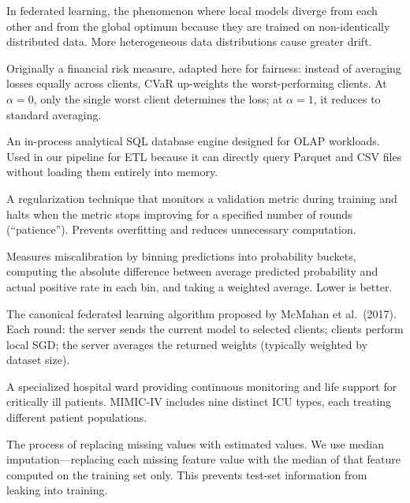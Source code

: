 \documentclass[11pt,a4paper]{report}
\begin{document}
\begin{description}[leftmargin=2em,style=nextline]
\item[\textbf{Client Drift}] In federated learning, the phenomenon where local models diverge from each other and from the global optimum because they are trained on non-identically distributed data. More heterogeneous data distributions cause greater drift.

\item[\textbf{CVaR (Conditional Value-at-Risk)}] Originally a financial risk measure, adapted here for fairness: instead of averaging losses equally across clients, CVaR up-weights the worst-performing clients. At $\alpha=0$, only the single worst client determines the loss; at $\alpha=1$, it reduces to standard averaging.

\item[\textbf{DuckDB}] An in-process analytical SQL database engine designed for OLAP workloads. Used in our pipeline for ETL because it can directly query Parquet and CSV files without loading them entirely into memory.

\item[\textbf{Early Stopping}] A regularization technique that monitors a validation metric during training and halts when the metric stops improving for a specified number of rounds (``patience''). Prevents overfitting and reduces unnecessary computation.

\item[\textbf{ECE (Expected Calibration Error)}] Measures miscalibration by binning predictions into probability buckets, computing the absolute difference between average predicted probability and actual positive rate in each bin, and taking a weighted average. Lower is better.

\item[\textbf{Federated Averaging (FedAvg)}] The canonical federated learning algorithm proposed by McMahan et al.\ (2017). Each round: the server sends the current model to selected clients; clients perform local SGD; the server averages the returned weights (typically weighted by dataset size).

\item[\textbf{ICU (Intensive Care Unit)}] A specialized hospital ward providing continuous monitoring and life support for critically ill patients. MIMIC-IV includes nine distinct ICU types, each treating different patient populations.

\item[\textbf{Imputation}] The process of replacing missing values with estimated values. We use median imputation---replacing each missing feature value with the median of that feature computed on the training set only. This prevents test-set information from leaking into training.


\end{description}
\end{document}
